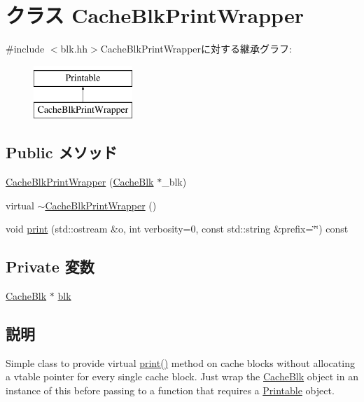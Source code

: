 \hypertarget{classCacheBlkPrintWrapper}{
\section{クラス CacheBlkPrintWrapper}
\label{classCacheBlkPrintWrapper}
}


{\ttfamily \#include $<$blk.hh$>$}CacheBlkPrintWrapperに対する継承グラフ:\begin{figure}[H]
\begin{center}
\leavevmode
\includegraphics[height=2cm]{classCacheBlkPrintWrapper}
\end{center}
\end{figure}
\subsection*{Public メソッド}
\begin{DoxyCompactItemize}
\item 
\hyperlink{classCacheBlkPrintWrapper_a4b5ab8f57a3beda7935f1549b97ed4ee}{CacheBlkPrintWrapper} (\hyperlink{classCacheBlk}{CacheBlk} $\ast$\_\-blk)
\item 
virtual \hyperlink{classCacheBlkPrintWrapper_a3d965b4918362110eb2a8a6a3e348bf9}{$\sim$CacheBlkPrintWrapper} ()
\item 
void \hyperlink{classCacheBlkPrintWrapper_ae31e5ec0b459f751b386d17dd75855d1}{print} (std::ostream \&o, int verbosity=0, const std::string \&prefix=\char`\"{}\char`\"{}) const 
\end{DoxyCompactItemize}
\subsection*{Private 変数}
\begin{DoxyCompactItemize}
\item 
\hyperlink{classCacheBlk}{CacheBlk} $\ast$ \hyperlink{classCacheBlkPrintWrapper_a73fc018cafd4a76a537fa7841ff7b406}{blk}
\end{DoxyCompactItemize}


\subsection{説明}
Simple class to provide virtual \hyperlink{classCacheBlkPrintWrapper_ae31e5ec0b459f751b386d17dd75855d1}{print()} method on cache blocks without allocating a vtable pointer for every single cache block. Just wrap the \hyperlink{classCacheBlk}{CacheBlk} object in an instance of this before passing to a function that requires a \hyperlink{classPrintable}{Printable} object. 

